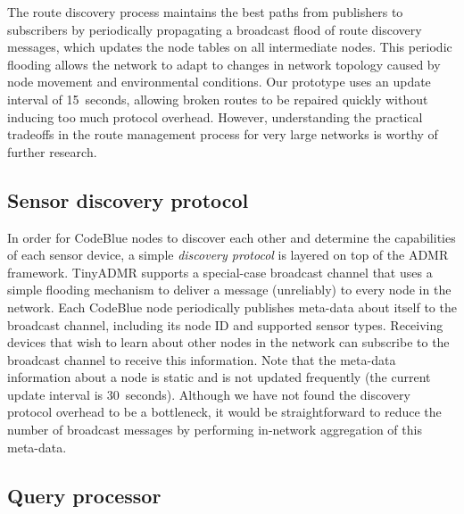 The route discovery process maintains the best paths from publishers
to subscribers by periodically propagating a broadcast
flood of route discovery messages, which updates the node tables on 
all intermediate nodes. This 
periodic flooding allows the network to adapt to changes in network
topology caused by node movement and environmental conditions. Our prototype
uses an update interval of 15~seconds, allowing broken routes
to be repaired quickly without inducing too much protocol
overhead. However, understanding the practical tradeoffs in the route
management process for very large networks is worthy of further
research.

\subsection{Sensor discovery protocol}

In order for CodeBlue nodes to discover each other and determine the
capabilities of each sensor device, a simple {\em discovery protocol}
is layered on top of the ADMR framework. TinyADMR supports a
special-case broadcast channel that uses a simple flooding
mechanism to deliver a message (unreliably) to every node in the
network. Each CodeBlue node periodically publishes meta-data about
itself to the broadcast channel, including its node ID and supported
sensor types. Receiving devices that wish to learn about other nodes
in the network can subscribe to the broadcast channel to receive this
information. Note that the meta-data information about a node is static
and is not updated frequently (the current update interval is
30~seconds). Although we have not found the discovery protocol overhead
to be a bottleneck, it would be straightforward to reduce the number of
broadcast messages by performing in-network aggregation of this
meta-data.

\subsection{Query processor}

